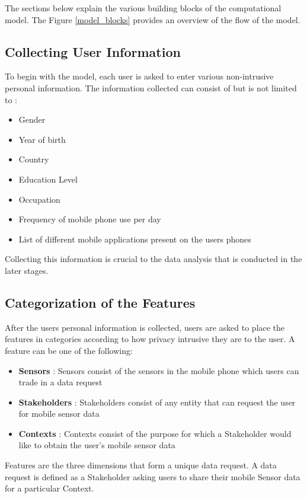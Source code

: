 The sections below explain the various building blocks of the computational model. The Figure \ref{model_blocks}
provides an overview of the flow of the model.

\subsection{Collecting User Information}
To begin with the model, each user is asked to enter various non-intrusive personal information. The information collected can consist of but is not limited to :

\begin{itemize}
\item Gender
\item Year of birth
\item Country
\item Education Level
\item Occupation
\item Frequency of mobile phone use per day
\item List of different mobile applications present on the users phones
\end{itemize}

Collecting this information is crucial to the data analysis that is conducted in the later stages.
\subsection{Categorization of the Features} \label{catfeatures}
After the users personal information is collected, users are asked to place the features in categories according to how privacy intrusive they are to the user. A feature can be one of the following:

\begin{itemize}
\item \textbf{Sensors} : Sensors consist of the sensors in the mobile phone which users
can trade in a data request
\item \textbf{Stakeholders} : Stakeholders
consist of any entity that can request the user for mobile sensor data
\item \textbf{Contexts} : Contexts consist of the purpose for which a Stakeholder would like to obtain the user's mobile sensor data
\end{itemize}

Features are the three dimensions that form a unique data request. A data request is defined as a Stakeholder asking users to share their mobile Sensor data for a particular Context.

